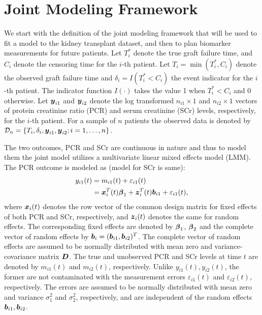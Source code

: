 
\section{Joint Modeling Framework}
\label{sec : jm_framework}
We start with the definition of the joint modeling framework that will be used to fit a model to the kidney transplant dataset, and then to plan biomarker measurements for future patients. Let $T_i^*$ denote the true graft failure time, and $C_i$ denote the censoring time for the $i$-th patient. Let $T_i = \min(T^*_i, C_i)$ denote the observed graft failure time and $\delta_i = I(T^*_i < C_i)$ the event indicator for the $i$-th patient. The indicator function $I(\cdot)$ takes the value 1 when $T^*_i < C_i$ and 0 otherwise. Let $\boldsymbol{y}_{i1}$ and $\boldsymbol{y}_{i2}$ denote the log transformed $n_{i1} \times 1$ and $n_{i2} \times 1$ vectors of protein creatinine ratio (PCR) and serum creatinine (SCr) levels, respectively, for the $i$-th patient. For a sample of $n$ patients the observed data is denoted by $\mathcal{D}_n = \{T_i, \delta_i, \boldsymbol{y}_{i1}, \boldsymbol{y}_{i2}; i = 1, \ldots, n\}$.

The two outcomes, PCR and SCr are continuous in nature and thus to model them the joint model utilizes a multivariate linear mixed effects model (LMM). The PCR outcome is modeled as (model for SCr is same):
\begin{equation*}
\begin{split}
y_{i1}(t) &= m_{i1}(t) + \varepsilon_{i1}(t)\\
&=\boldsymbol{x}_{i}^T(t) \boldsymbol{\beta}_1 + \boldsymbol{z}_{i}^T(t) \boldsymbol{b}_{i1} + \varepsilon_{i1}(t),
\end{split}
\end{equation*}
where $\boldsymbol{x}_{i}(t)$ denotes the row vector of the common design matrix for fixed effects of both PCR and SCr, respectively, and $\boldsymbol{z}_{i}(t)$ denotes the same for random effects. The corresponding fixed effects are denoted by $\boldsymbol{\beta}_1$, $\boldsymbol{\beta}_2$ and the complete vector of random effects by $\boldsymbol{b}_i = (\boldsymbol{b}_{i1}, \boldsymbol{b}_{i2})^T$. The complete vector of random effects are assumed to be normally distributed with mean zero and variance-covariance matrix $\boldsymbol{D}$. The true and unobserved PCR and SCr levels at time $t$ are denoted by $m_{i1}(t)$ and $m_{i2}(t)$, respectively. Unlike $y_{i1}(t), y_{i2}(t)$, the former are not contaminated with the measurement errors $\varepsilon_{i1}(t)$ and $\varepsilon_{i2}(t)$, respectively. The errors are assumed to be normally distributed with mean zero and variance $\sigma_1^2$ and $\sigma_2^2$, respectively, and are independent of the random effects $\boldsymbol{b}_{i1}, \boldsymbol{b}_{i2}$.

